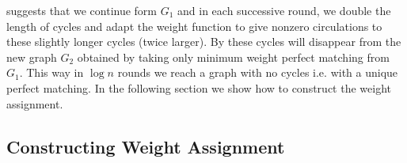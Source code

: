  suggests that we continue form $G_1$ and in each successive round, we double the length of cycles and adapt the weight function to give nonzero circulations to these slightly longer cycles (twice larger). By  these cycles will disappear from the new graph $G_2$ obtained by taking only minimum weight perfect matching from $G_1$. This way in $\log n$ rounds we reach a graph with no cycles i.e. with a unique perfect matching. In the following section we show how to construct the weight assignment.
\subsection{Constructing Weight Assignment}
